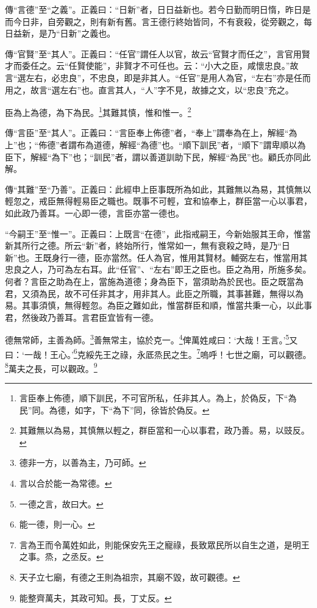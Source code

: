 {\noindent\zhuan{}\fzbyks 傳“言德”至“之義”。正義曰：“日新”者，日日益新也。若今日勤而明日惰，昨日是而今日非，自旁觀之，則有新有舊。言王德行終始皆同，不有衰殺，從旁觀之，每日益新，是乃“日新”之義也。 \par}

{\noindent\zhuan{}\fzbyks 傳“官賢”至“其人”。正義曰：“任官”謂任人以官，故云“官賢才而任之”，言官用賢才而委任之。云“任賢使能”，非賢才不可任也。云：“小大之臣，咸懷忠良。”故言“選左右，必忠良”，不忠良，即是非其人。“任官”是用人為官，“左右”亦是任而用之，故言“選左右”也。直言其人，“人”字不見，故據之文，以“忠良”充之。 \par}

臣為上為德，為下為民。\footnote{言臣奉上佈德，順下訓民，不可官所私，任非其人。為上，於偽反，下“為民”同。為德，如字，下“為下”同，徐皆於偽反。}其難其慎，惟和惟一。\footnote{其難無以為易，其慎無以輕之，群臣當和一心以事君，政乃善。易，以豉反。}

{\noindent\zhuan{}\fzbyks 傳“言臣”至“其人”。正義曰：“言臣奉上佈德”者，“奉上”謂奉為在上，解經“為上”也；“佈德”者謂布為道德，解經“為德”也。“順下訓民”者，“順下”謂卑順以為臣下，解經“為下”也；“訓民”者，謂以善道訓助下民，解經“為民”也。顧氏亦同此解。 \par}

{\noindent\zhuan{}\fzbyks 傳“其難”至“乃善”。正義曰：此經申上臣事既所為如此，其難無以為易，其慎無以輕忽之，戒臣無得輕易臣之職也。既事不可輕，宜和協奉上，群臣當一心以事君，如此政乃善耳。一心即一德，言臣亦當一德也。 \par}

{\noindent\shu{}\fzkt “今嗣王”至“惟一”。正義曰：上既言“在德”，此指戒嗣王，今新始服其王命，惟當新其所行之德。所云“新”者，終始所行，惟常如一，無有衰殺之時，是乃“日新”也。王既身行一德，臣亦當然。任人為官，惟用其賢材。輔弼左右，惟當用其忠良之人，乃可為左右耳。此“任官”、“左右”即王之臣也。臣之為用，所施多矣。何者？言臣之助為在上，當施為道德；身為臣下，當須助為於民也。臣之既當為君，又須為民，故不可任非其才，用非其人。此臣之所職，其事甚難，無得以為易。其事須慎，無得輕忽。為臣之難如此，惟當群臣和順，惟當共秉一心，以此事君，然後政乃善耳。言君臣宜皆有一德。 \par}

德無常師，主善為師。\footnote{德非一方，以善為主，乃可師。}善無常主，協於克一。\footnote{言以合於能一為常德。}俾萬姓咸曰：‘大哉！王言。’\footnote{一德之言，故曰大。}又曰：‘一哉！王心。’\footnote{能一德，則一心。}克綏先王之祿，永厎烝民之生。\footnote{言為王而令萬姓如此，則能保安先王之寵祿，長致眾民所以自生之道，是明王之事。烝，之丞反。}嗚呼！七世之廟，可以觀德。\footnote{天子立七廟，有德之王則為祖宗，其廟不毀，故可觀德。}萬夫之長，可以觀政。\footnote{能整齊萬夫，其政可知。長，丁丈反。}


